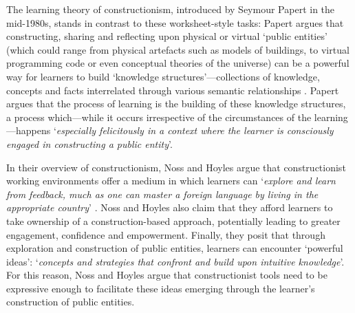 The learning theory of constructionism, introduced by Seymour Papert in the mid-1980s, stands in contrast to these worksheet-style tasks: Papert argues that constructing, sharing and reflecting upon physical or virtual `public entities' (which could range from physical artefacts such as models of buildings, to virtual programming code or even conceptual theories of the universe) can be a powerful way for learners to build `knowledge structures'---collections of knowledge, concepts and facts interrelated through various semantic relationships \citep{Papert1991}. Papert argues that the process of learning is the building of these knowledge structures, a process which---while it occurs irrespective of the circumstances of the learning---happens `\textit{especially felicitously in a context where the learner is consciously engaged in constructing a public entity}'. 

In their overview of constructionism, Noss and Hoyles argue that constructionist working environments offer a medium in which learners can `\textit{explore and learn from feedback, much as one can master a foreign language by living in the appropriate country}' \citep{Noss2017}. Noss and Hoyles also claim that they afford learners to take ownership of a construction-based approach, potentially leading to greater engagement, confidence and empowerment. Finally, they posit that through exploration and construction of public entities, learners can encounter `powerful ideas': `\textit{concepts and strategies  that confront and build upon intuitive knowledge}'. For this reason, Noss and Hoyles argue that constructionist tools need to be expressive enough to facilitate these ideas emerging through the learner's construction of public entities.

